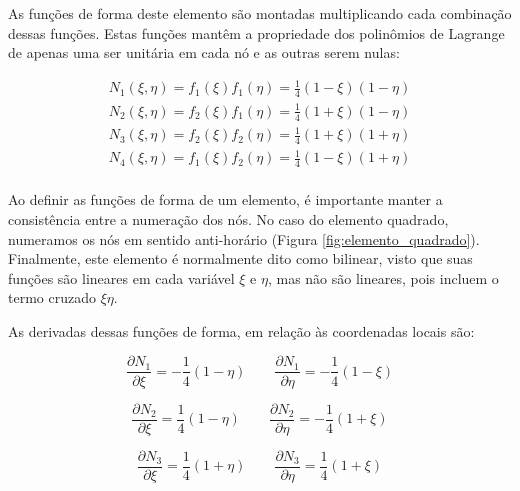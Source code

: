         As funções de forma deste elemento são montadas multiplicando cada combinação dessas funções. Estas funções mantêm a propriedade dos polinômios de Lagrange de apenas uma ser unitária em cada nó e as outras serem nulas:

        \begin{equation}
            \begin{array}{l}
                N_1(\xi, \eta) = f_1(\xi)f_1(\eta) = \frac{1}{4}\left(1-\xi\right)\left(1-\eta\right)\\
                N_2(\xi, \eta) = f_2(\xi)f_1(\eta) = \frac{1}{4}\left(1+\xi\right)\left(1-\eta\right)\\
                N_3(\xi, \eta) = f_2(\xi)f_2(\eta) = \frac{1}{4}\left(1+\xi\right)\left(1+\eta\right)\\
                N_4(\xi, \eta) = f_1(\xi)f_2(\eta) = \frac{1}{4}\left(1-\xi\right)\left(1+\eta\right)\\
            \end{array}
        \end{equation}

        Ao definir as funções de forma de um elemento, é importante manter a consistência entre a numeração dos nós. No caso do elemento quadrado, numeramos os nós em sentido anti-horário (Figura \ref{fig:elemento_quadrado}). Finalmente, este elemento é normalmente dito como bilinear, visto que suas funções são lineares em cada variável $\xi$ e $\eta$, mas não são lineares, pois incluem o termo cruzado $\xi \eta$.

        As derivadas dessas funções de forma, em relação às coordenadas locais são:

        \begin{equation*}
            \frac{\partial N_1}{\partial \xi} = -\frac{1}{4}\left(1-\eta\right)  \quad \quad 
            \frac{\partial N_1}{\partial \eta} = -\frac{1}{4}\left(1-\xi\right)
        \end{equation*}

        \begin{equation*}
            \frac{\partial N_2}{\partial \xi} = \frac{1}{4}\left(1-\eta\right)  \quad \quad 
            \frac{\partial N_2}{\partial \eta} = -\frac{1}{4}\left(1+\xi\right)
        \end{equation*}

        \begin{equation*}
            \frac{\partial N_3}{\partial \xi} = \frac{1}{4}\left(1+\eta\right)  \quad \quad 
            \frac{\partial N_3}{\partial \eta} = \frac{1}{4}\left(1+\xi\right)
        \end{equation*}

